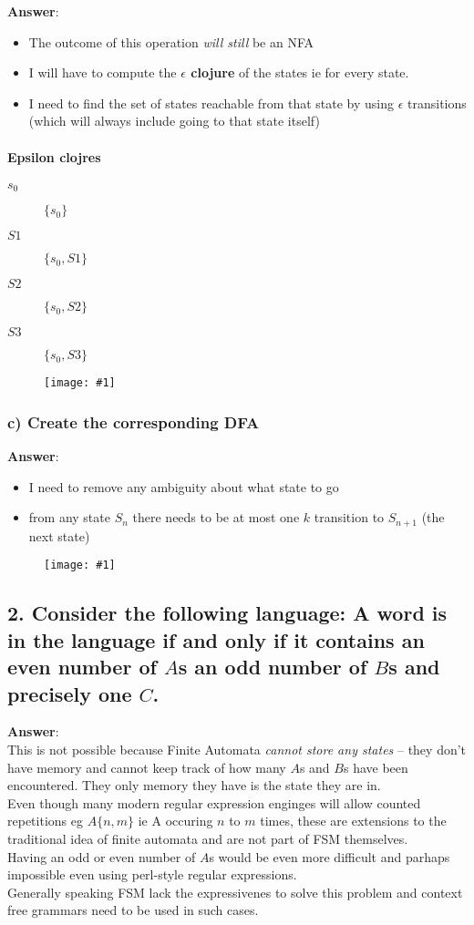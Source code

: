 \documentclass[a4paper, 14pt]{report}
\newcommand{\centeredimg}[1]{%
	\begin{figure}[h]
		\begin{center}
			\texttt{[image: \#1]}
		\end{center}
\end{figure}}
\newcommand{\answer}[1]{%
	\begin{flushleft}
		\textbf{Answer}:\\
			#1
	\end{flushleft}}
\newcommand{\question}[1]{\subsection*{#1}}
\begin{document}
\answer{%

	\begin{itemize}		
		\item The outcome of this operation \textit{will still} be an NFA
		\item I will have to compute the \textbf{$\epsilon$ clojure} of the
			states ie for every state.
		\item I need to find the set of states reachable from
			that state by using $\epsilon$ transitions (which will always include going to that state itself)
	\end{itemize}

	\pagebreak

	\paragraph{Epsilon clojres}

	\begin{description}
	  \item [$s_0$] $\{s_0\}$
	  \item [$S1$] $\{s_0, S1\}$
	  \item [$S2$] $\{s_0, S2\}$
	  \item [$S3$] $\{s_0, S3\}$
	\end{description}

	\centeredimg{rl_1_b.jpg}
} 

\subsubsection*{c) Create the corresponding DFA}

\answer{%

	\begin{itemize}		
	  \item I need to remove any ambiguity about what state to go 
	  \item from any state $S_n$ there needs to be at most one $k$
	  transition to $S_{n+1}$ (the next state)
	\end{itemize}		

	\centeredimg{rl_1_c.jpg}
}

\pagebreak

\question{2. Consider the following language: A word is in the language if
  and only if it contains an even number of $A$s an odd number of $B$s and precisely one $C$.}

\answer{This is not possible because Finite Automata \textit{cannot store
any states}
	-- they don't have memory and cannot keep track of how many $A$s
	and $B$s have been encountered. They only memory they have is the
	state they are in.  \\
	Even though many modern regular expression enginges will allow
	counted repetitions eg $A\{n,m\}$ ie A occuring $n$ to $m$ times,
	these are extensions to the traditional idea of finite automata
	and are not part of FSM themselves. \\ 
	Having an odd or even number of $A$s would be even more difficult
	and parhaps impossible even using perl-style regular expressions. \\
	Generally speaking FSM lack the
	expressivenes to solve this problem and context free grammars need
	to be used in such cases.}
\end{document}
